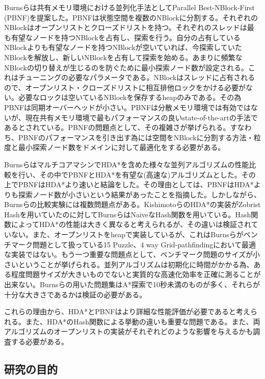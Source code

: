 \documentclass{jsarticle}
\begin{document}
Burnsらは共有メモリ環境における並列化手法としてParallel Best-NBlock-First (PBNF)を提案した\cite{Burns2010}。PBNFは状態空間を複数のNBlockに分割する。それぞれのNBlockはオープンリストとクローズドリストを持つ。それぞれのスレッドは最も有望なノードを持つNBlockを占有し、探索を行う。自分の占有しているNBlockよりも有望なノードを持つNBlockが空いていれば、今探索していたNBlockを解放し、新しいNBlockを占有して探索を始める。あまりに頻繁なNBlockの切り替えが生じるのを防ぐために最小探索ノード数が設定される。これはチューニングの必要なパラメータである。NBlockはスレッドに占有されるので、オープンリスト・クローズドリストに相互排他ロックをかける必要がない。必要なロックは空いているNBlockを保存するheapのみである。その為PBNFは同期オーバーヘッドが小さい。PBNFは分散メモリ環境では有効ではないが、現在共有メモリ環境で最もパフォーマンスの良いstate-of-the-artの手法であるとされている。PBNFの問題点として、その複雑さが挙げられる。すなわち、PBNFのパフォーマンスを引き出す為には空間をNBlockに分割する方法・粒度と最小探索ノード数をドメインに対して最適化をする必要がある。
\newline

BurnsらはマルチコアマシンでHDA*を含めた様々な並列アルゴリズムの性能比較を行い、その中でPBNFとHDA*を有望な(高速な)アルゴリズムとした。その上でPBNFはHDA*より速いと結論をした。その理由としては、PBNFはHDA*よりも探索ノード数が小さいという結果があったことを指摘した。しかしながら、Burnsらの比較実験には複数問題点がある。KishimotoらのHDA*の実装がZobrist Hash\cite{Zobrist1970}を用いていたのに対してBurnsらはNaiveなHash関数を用いている。Hash関数によってHDA*の性能は大きく異なると考えられるが、その違いは検証されていない。また、オープンリストをheapで実装しているが、これはBurnsらがベンチマーク問題として扱っている15 Puzzle、4 way Grid-pathfindingにおいて最適な実装ではない\cite{Burns2012implementing}。もう一つ重要な問題点として、ベンチマーク問題のサイズが小さいということが挙げられる。並列アルゴリズムは初期化に時間がかかる為、ある程度問題サイズが大きいものでないと実質的な高速化効率を正確に測ることが出来ない。Burnsらの用いた問題集はA*探索で10秒未満のものが多く、それらが十分な大きさであるかは検証の必要がある。
\newline

これらの理由から、HDA*とPBNFはより詳細な性能評価が必要であると考えられる。また、HDA*のHash関数による挙動の違いも重要な問題である。また、両アルゴリズムのオープンリストの実装がそれぞれどのような影響を与えるかも調査する必要がある。

\subsection{研究の目的}
\end{document}

